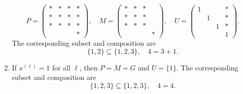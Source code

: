 \documentclass[reqno]{amsart} 
\begin{document}
\begin{example}
\begin{enumerate}
    \begin{equation*}
      P = 
      \begin{pmatrix}
        \ast & \ast & \ast & \ast \\
        \ast & \ast & \ast & \ast \\
        \ast & \ast & \ast & \ast \\
             & &  & \ast
      \end{pmatrix}
      , \quad M = 
      \begin{pmatrix}
        \ast & \ast & \ast &  \\
        \ast & \ast & \ast  &  \\
        \ast & \ast  & \ast &  \\
             & & & \ast
      \end{pmatrix}
      , \quad U = 
      \begin{pmatrix}
        1 &  &  & \ast \\
          & 1 &  & \ast \\
          &  & 1 & \ast \\
          & & & 1
      \end{pmatrix}
      .
    \end{equation*}
    The corresponding subset and composition are
    \begin{equation*}
      \{1,2\} \subseteq \{1,2,3\},
      \quad
      4 = 3 + 1.
    \end{equation*}
  \item If $x^{(\ell)} = 1$ for all $\ell$, then $P = M = G$ and $U = \{1\}$.
    The corresponding subset and composition are
    \begin{equation*}
      \{1,2,3\} \subseteq \{1,2,3\},
      \quad
      4 = 4.
    \end{equation*}
  \end{enumerate}
\end{example}
\end{document}
